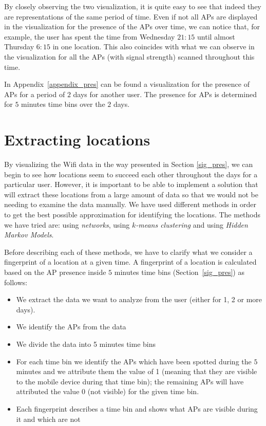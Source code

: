 By closely observing the two visualization, it is quite easy to see that indeed
they are representations of the same period of time. Even if not all APs are
displayed in the visualization for the presence of the APs over time, we can
notice that, for example, the user has spent the time from Wednesday $21:15$
until almost Thursday $6:15$ in one location. This also coincides with what we
can observe in the visualization for all the APs (with signal strength) scanned
throughout this time.

In Appendix~\ref{appendix_pres} can be found a visualization for the presence of
APs for a period of $2$ days for another user. The presence for APs is
determined for $5$ minutes time bins over the $2$ days.

\section{Extracting locations}
\label{extracting_location}

By visualizing the Wifi data in the way presented in Section \ref{sig_pres}, we
can begin to see how locations seem to succeed each other throughout the days
for a particular user. However, it is important to be able to implement a solution
that will extract these locations from a large amount of data so that we would
not be needing to examine the data manually. We have used different methods in
order to get the best possible approximation for identifying the locations. The
methods we have tried are: using \textit{networks}, using \textit{$k$-means
clustering} and using \textit{Hidden Markov Models}.

Before describing each of these methods, we have to clarify what we consider a
fingerprint of a location at a given time. A fingerprint of a location is
calculated based on the AP presence inside $5$ minutes time bins
(Section~\ref{sig_pres}) as follows:
\begin{itemize}
  \item We extract the data we want to analyze from the user (either for 1, 2
  or more days).
  \item We identify the APs from the data
  \item We divide the data into 5 minutes time bins
  \item For each time bin we identify the APs which have been spotted during the
  $5$ minutes and we attribute them the value of 1 (meaning that they are
  visible to the mobile device during that time bin); the remaining APs will
  have attributed the value 0 (not visible) for the given time bin.
  \item Each fingerprint describes a time bin and shows what APs are visible
  during it and which are not
\end{itemize}

